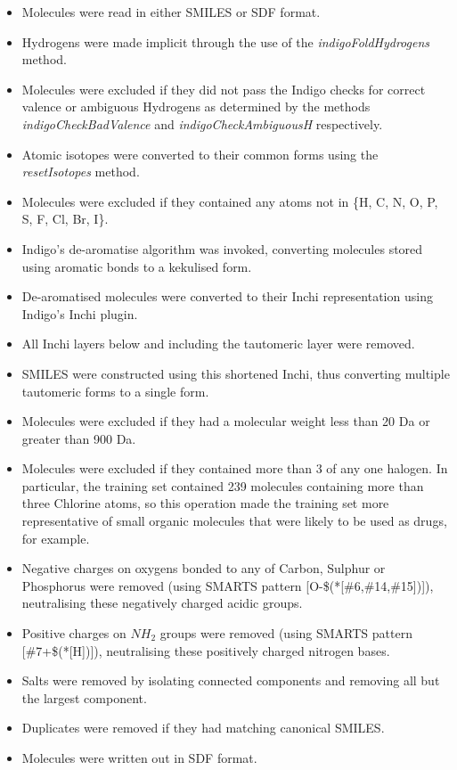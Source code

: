 \begin{itemize}
\item Molecules were read in either SMILES or SDF format.
\item Hydrogens were made implicit through the use of the \textit{indigoFoldHydrogens} method. 
\item Molecules were excluded if they did not pass the Indigo checks for correct valence or ambiguous Hydrogens as determined by the methods \textit{indigoCheckBadValence} and \textit{indigoCheckAmbiguousH} respectively.
\item Atomic isotopes were converted to their common forms using the \textit{resetIsotopes} method. 
\item Molecules were excluded if they contained any atoms not in \{H, C, N, O, P, S, F, Cl, Br, I\}. 
\item Indigo's de-aromatise algorithm was invoked,  converting molecules stored using aromatic bonds to a kekulised form.
\item De-aromatised molecules were converted to their Inchi representation \cite{_iupac_????} using Indigo's Inchi plugin. 
\item All Inchi layers below and including the tautomeric layer were removed.
\item SMILES were constructed using this shortened Inchi, thus converting multiple tautomeric forms to a single form. 
\item Molecules were excluded if they had a molecular weight less than 20 Da or greater than 900 Da. 
\item Molecules were excluded if they contained more than 3 of any one halogen. In particular, the training set contained 239 molecules containing more than three Chlorine atoms, so this operation made the training set more representative of small organic molecules that were likely to be used as drugs, for example.
\item Negative charges on oxygens bonded to any of Carbon, Sulphur or Phosphorus were removed (using SMARTS pattern [O-\$(*[\#6,\#14,\#15])]), neutralising these negatively charged acidic groups.
\item Positive charges on $NH_2$ groups were removed (using SMARTS pattern [\#7+\$(*[H])]), neutralising these positively charged nitrogen bases.
\item Salts were removed by isolating connected components and removing all but the largest component.
\item Duplicates were removed if they had matching canonical SMILES. 
\item Molecules were written out in SDF format.
\end{itemize}

